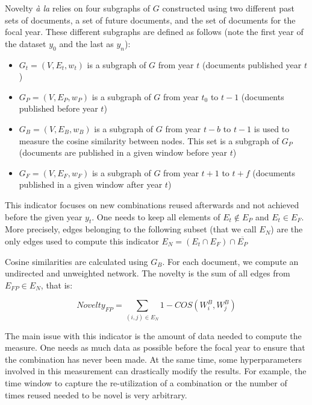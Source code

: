 Novelty \textit{à la} \cite{wang2017bias} relies on four subgraphs of $G$ constructed using two different past sets of documents, a set of future documents, and the set of documents for the focal year. These different subgraphs are defined as follows (note the first year of the dataset $y_0$ and the last as $y_n$):
\begin{itemize}
    \item $G_t=(V,E_t,w_t)$ is a subgraph of $G$ from year $t$ (documents published year $t$)
    \item $G_P=(V,E_P,w_P)$ is a subgraph of $G$ from year $t_0$ to $t-1$ (documents published before year $t$)
    \item $G_{B}=(V,E_{B},w_{B})$ is a subgraph of $G$ from year $t-b$ to $t-1$ is used to measure the cosine similarity between nodes. This set is a subgraph of $G_P$ (documents are published in a given window before year $t$)
    \item $G_F=(V,E_F,w_F)$ is a subgraph of $G$ from year $t+1$ to $t+f$ (documents published in a given window after year $t$)
\end{itemize}



This indicator focuses on new combinations reused afterwards and not achieved before the given year $y_t$. One needs to keep all elements of $E_t \notin E_P$ and $E_t \in E_F$. More precisely, edges belonging to the following subset (that we call $E_N$) are the only edges used to compute this indicator $E_N = (E_t \cap E_F) \cap \overline{E_P}$

Cosine similarities are calculated using $G_{B}$. For each document, we compute an undirected and unweighted network. The novelty is the sum of all edges from $E_{FP} \in E_N$, that is:

$$ Novelty_{FP} = \sum\limits_{(i, j )\in E_N}1-COS(W^B_i,W^B_j)$$

\begin{figure}[h]
  \centering
  
  \caption[\cite{wang2017bias}]{\cite{wang2017bias} \footnotemark}
\end{figure} 

The main issue with this indicator is the amount of data needed to compute the measure. One needs as much data as possible before the focal year to ensure that the combination has never been made. At the same time, some hyperparameters involved in this measurement can drastically modify the results. For example, the time window to capture the re-utilization of a combination or the number of times reused needed to be novel is very arbitrary.


